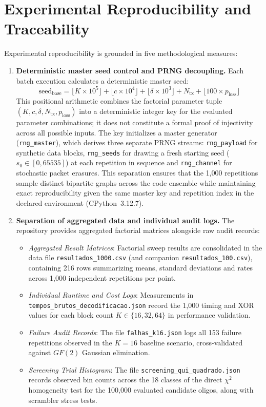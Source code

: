 \section{Experimental Reproducibility and Traceability}
\label{sec:reproducibility}

Experimental reproducibility is grounded in five methodological measures:

\begin{enumerate}
    \item \textbf{Deterministic master seed control and PRNG decoupling.} Each batch execution calculates a deterministic master seed:
    \begin{equation}
        \label{eq:master_seed}
        \text{seed}_{\text{base}} = \lfloor K \times 10^5 \rfloor + \lfloor c \times 10^4 \rfloor + \lfloor \delta \times 10^3 \rfloor + N_{\text{tx}} + \lfloor 100 \times p_{\text{loss}} \rfloor
    \end{equation}
    This positional arithmetic combines the factorial parameter tuple $(K, c, \delta, N_{\text{tx}}, p_{\text{loss}})$ into a deterministic integer key for the evaluated parameter combinations; it does not constitute a formal proof of injectivity across all possible inputs. The key initializes a master generator (\texttt{rng\_master}), which derives three separate PRNG streams: \texttt{rng\_payload} for synthetic data blocks, \texttt{rng\_seeds} for drawing a fresh starting seed ($s_0 \in [0, 65535]$) at each repetition in sequence and \texttt{rng\_channel} for stochastic packet erasures. This separation ensures that the 1,000 repetitions sample distinct bipartite graphs across the code ensemble while maintaining exact reproducibility given the same master key and repetition index in the declared environment (CPython~3.12.7).

    \item \textbf{Separation of aggregated data and individual audit logs.} The repository provides aggregated factorial matrices alongside raw audit records:
    \begin{itemize}
        \item \emph{Aggregated Result Matrices}: Factorial sweep results are consolidated in the data file \texttt{resultados\_1000.csv} (and companion \texttt{resultados\_100.csv}), containing 216 rows summarizing means, standard deviations and rates across 1,000 independent repetitions per point.
        \item \emph{Individual Runtime and Cost Logs}: Measurements in \texttt{tempos\_brutos\_decodificacao.json} record the 1,000 timing and XOR values for each block count $K \in \{16, 32, 64\}$ in performance validation.
        \item \emph{Failure Audit Records}: The file \texttt{falhas\_k16.json} logs all 153 failure repetitions observed in the $K=16$ baseline scenario, cross-validated against $GF(2)$ Gaussian elimination.
        \item \emph{Screening Trial Histogram}: The file \texttt{screening\_qui\_quadrado.json} records observed bin counts across the 18 classes of the direct $\chi^2$ homogeneity test for the 100,000 evaluated candidate oligos, along with scrambler stress tests.
    \end{itemize}


\end{enumerate}
